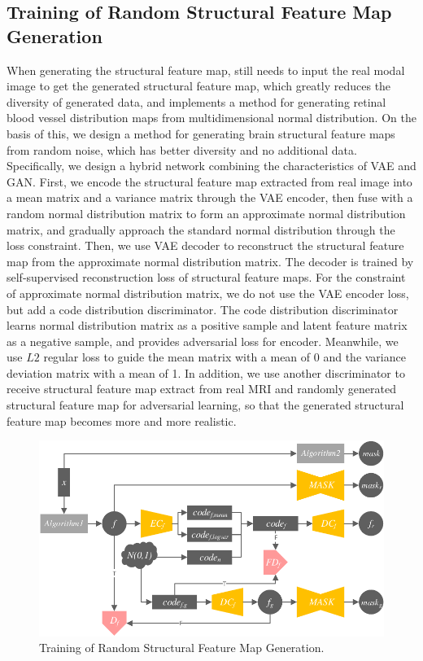 \documentclass[letterpaper]{article} %
\begin{document}
\subsection{Training of Random Structural Feature Map Generation}

When generating the structural feature map, \cite{4shin2018medical} still needs to input the real modal image to get the generated structural feature map, which greatly reduces the diversity of generated data, and \cite{41costa2017towards} implements a method for generating retinal blood vessel distribution maps from multidimensional normal distribution. On the basis of this, we design a method for generating brain structural feature maps from random noise, which has better diversity and no additional data. 
Specifically, we design a hybrid network combining the characteristics of VAE and GAN. First, we encode the structural feature map extracted from real image into a mean matrix and a variance matrix through the VAE encoder, then fuse with a random normal distribution matrix to form an approximate normal distribution matrix, and gradually approach the standard normal distribution through the loss constraint. Then, we use VAE decoder to reconstruct the structural feature map from the approximate normal distribution matrix. The decoder is trained by self-supervised reconstruction loss of structural feature maps. For the constraint of approximate normal distribution matrix, we do not use the VAE encoder loss, but add a code distribution discriminator. The code distribution discriminator learns normal distribution matrix as a positive sample and latent feature matrix as a negative sample, and provides adversarial loss for encoder. Meanwhile, we use $L2$ regular loss to guide the mean matrix with a mean of 0 and the variance deviation matrix with a mean of 1. In addition, we use another discriminator to receive structural feature map extract from real MRI and randomly generated structural feature map for adversarial learning, so that the generated structural feature map becomes more and more realistic.
\begin{figure}
	\centering
	\includegraphics[width=0.98\columnwidth]{figures/feature_train}
	\caption{Training of Random Structural Feature Map Generation.}
	\label{feature_train}
\end{figure}
\end{document}
